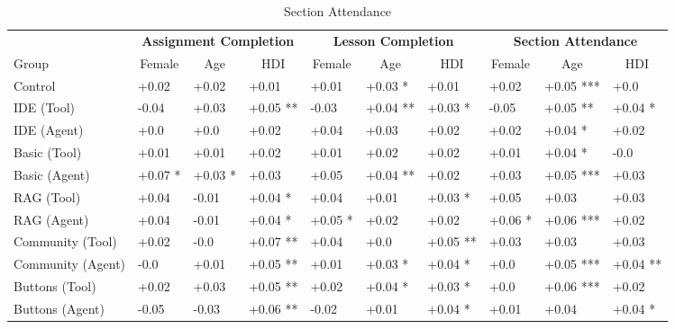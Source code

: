 \begin{table*}[t]
\centering
\begin{tabularx}{\textwidth}{lXXXXXXXXX}
\toprule
& \multicolumn{3}{c}{\textbf{Assignment Completion}} & \multicolumn{3}{c}{\textbf{Lesson Completion}} & \multicolumn{3}{c}{\textbf{Section Attendance}} \\Group & \multicolumn{1}{c}{Female} & \multicolumn{1}{c}{Age} & \multicolumn{1}{c}{HDI} & \multicolumn{1}{c}{Female} & \multicolumn{1}{c}{Age} & \multicolumn{1}{c}{HDI} & \multicolumn{1}{c}{Female} & \multicolumn{1}{c}{Age} & \multicolumn{1}{c}{HDI} \\ 
\cmidrule(r{3mm}){1-1} \cmidrule(r{3mm}){2-4} \cmidrule(r{3mm}){5-7} \cmidrule(r{3mm}){8-10} 
Control  & +0.02 & +0.02 & +0.01 & +0.01 & +0.03 * & +0.01 & +0.02 & +0.05 *** & +0.0\\
IDE (Tool)  & -0.04 & +0.03 & +0.05 ** & -0.03 & +0.04 ** & +0.03 * & -0.05 & +0.05 ** & +0.04 *\\
IDE (Agent)  & +0.0 & +0.0 & +0.02 & +0.04 & +0.03 & +0.02 & +0.02 & +0.04 * & +0.02\\
Basic (Tool)  & +0.01 & +0.01 & +0.02 & +0.01 & +0.02 & +0.02 & +0.01 & +0.04 * & -0.0\\
Basic (Agent)  & +0.07 * & +0.03 * & +0.03 & +0.05 & +0.04 ** & +0.02 & +0.03 & +0.05 *** & +0.03\\
RAG (Tool)  & +0.04 & -0.01 & +0.04 * & +0.04 & +0.01 & +0.03 * & +0.05 & +0.03 & +0.03\\
RAG (Agent)  & +0.04 & -0.01 & +0.04 * & +0.05 * & +0.02 & +0.02 & +0.06 * & +0.06 *** & +0.02\\
Community (Tool)  & +0.02 & -0.0 & +0.07 ** & +0.04 & +0.0 & +0.05 ** & +0.03 & +0.03 & +0.03\\
Community (Agent)  & -0.0 & +0.01 & +0.05 ** & +0.01 & +0.03 * & +0.04 * & +0.0 & +0.05 *** & +0.04 **\\
Buttons (Tool)  & +0.02 & +0.03 & +0.05 ** & +0.02 & +0.04 * & +0.03 * & +0.0 & +0.06 *** & +0.02\\
Buttons (Agent)  & -0.05 & -0.03 & +0.06 ** & -0.02 & +0.01 & +0.04 * & +0.01 & +0.04 & +0.04 *\\
\bottomrule
\end{tabularx}
\caption{Section Attendance}
\label{tab:demo_table}
\end{table*}

